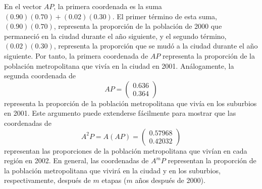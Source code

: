 \documentclass[12pt,a4paper]{book}
\begin{document}
    En el vector $AP$, la primera coordenada es la suma $(0.90)(0.70)+(0.02)(0.30)$. El primer término de esta suma, $(0.90)(0.70)$, representa la proporción de la población de 2000 que permaneció en la ciudad durante el año siguiente, y el segundo término, $(0.02)(0.30)$, representa la proporción que se mudó a la ciudad durante el año siguiente. Por tanto, la primera coordenada de $AP$ representa la proporción de la población metropolitana que vivía en la ciudad en 2001. Análogamente, la segunda coordenada de
    \begin{equation*}
        AP=\begin{pmatrix}0.636\\0.364\end{pmatrix}
    \end{equation*}
    representa la proporción de la población metropolitana que vivía en los suburbios en 2001. Este argumento puede extenderse fácilmente para mostrar que las coordenadas de
    \begin{equation*}
        A^2P=A(AP)=\begin{pmatrix}0.57968\\0.42032\end{pmatrix}
    \end{equation*}
    representan las proporciones de la población metropolitana que vivían en cada región en 2002. En general, las coordenadas de $A^mP$ representan la proporción de la población metropolitana que vivirá en la ciudad y en los suburbios, respectivamente, después de $m$ etapas ($m$ años después de 2000).
\end{document}
